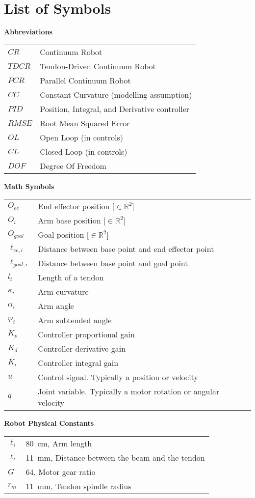 \section*{List of Symbols}

\newenvironment{tableofsymbols}
  {\par\vspace{\abovedisplayskip}\noindent\begin{tabular}{>{$}l<{$} @{${}={}$} l}}
  {\end{tabular}\par\vspace{\belowdisplayskip}}


\textbf{Abbreviations}
\begin{tableofsymbols}
\textit{CR} & Continuum Robot \\
\textit{TDCR} & Tendon-Driven Continuum Robot \\
\textit{PCR} & Parallel Continuum Robot \\ 
\textit{CC} & Constant Curvature (modelling assumption) \\
\textit{PID} & Position, Integral, and Derivative controller \\
\textit{RMSE} & Root Mean Squared Error \\
\textit{OL} & Open Loop (in controls) \\
\textit{CL} & Closed Loop (in controls) \\
\textit{DOF} & Degree Of Freedom \\
\end{tableofsymbols}


\noindent\textbf{Math Symbols}
\begin{tableofsymbols}
O_{ee} & End effector position [$\in \mathbb{R}^2$] \\
O_i & Arm base position [$\in \mathbb{R}^2$] \\
O_{goal} & Goal position [$\in \mathbb{R}^2$] \\
\ell_{ee, i} & Distance between base point and end effector point \\
\ell_{goal, i} & Distance between base point and goal point \\
l_t & Length of a tendon \\ 
\kappa_i & Arm curvature \\
\alpha_i & Arm angle \\
\varphi_i & Arm subtended angle \\
K_p & Controller proportional gain \\
K_d & Controller derivative gain \\
K_i & Controller integral gain \\
u & Control signal. Typically a position or velocity \\ 
q & Joint variable. Typically a motor rotation or angular velocity \\ 
\end{tableofsymbols}


\noindent\textbf{Robot Physical Constants}
\begin{tableofsymbols}
\ell_i & \SI{80}{cm}, Arm length \\
\ell_t & \SI{11}{mm}, Distance between the beam and the tendon \\ 
G & 64, Motor gear ratio \\ 
r_m & \SI{11}{mm}, Tendon spindle radius \\
\end{tableofsymbols}

